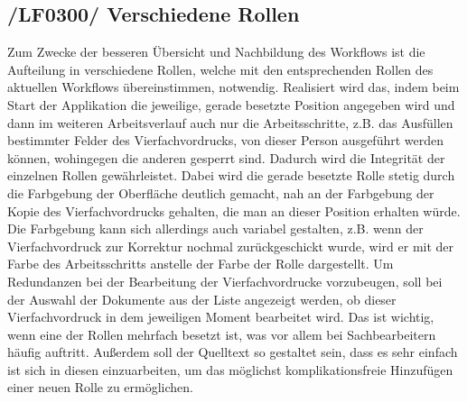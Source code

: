 \subsection{/LF0300/ Verschiedene Rollen}
Zum Zwecke der besseren Übersicht und Nachbildung des Workflows ist die Aufteilung in verschiedene Rollen, welche mit den entsprechenden Rollen des aktuellen Workflows übereinstimmen, notwendig. Realisiert wird das, indem beim Start der Applikation die jeweilige, gerade besetzte Position angegeben wird und dann im weiteren Arbeitsverlauf auch nur die Arbeitsschritte, z.B. das Ausfüllen bestimmter Felder des Vierfachvordrucks, von dieser Person ausgeführt werden können, wohingegen die anderen gesperrt sind. Dadurch wird die Integrität der einzelnen Rollen gewährleistet. Dabei wird die gerade besetzte Rolle stetig durch die Farbgebung der Oberfläche deutlich gemacht, nah an der Farbgebung der Kopie des Vierfachvordrucks gehalten, die man an dieser Position erhalten würde. Die Farbgebung kann sich allerdings auch variabel gestalten, z.B. wenn der Vierfachvordruck zur Korrektur nochmal zurückgeschickt wurde, wird er mit der Farbe des Arbeitsschritts anstelle der Farbe der Rolle dargestellt. Um Redundanzen bei der Bearbeitung der Vierfachvordrucke vorzubeugen, soll bei der Auswahl der Dokumente aus der Liste angezeigt werden, ob dieser Vierfachvordruck in dem jeweiligen Moment bearbeitet wird. Das ist wichtig, wenn eine der Rollen mehrfach besetzt ist, was vor allem bei  Sachbearbeitern häufig auftritt. Außerdem soll der Quelltext so gestaltet sein, dass es sehr einfach ist sich in diesen einzuarbeiten, um das möglichst komplikationsfreie Hinzufügen einer neuen Rolle zu ermöglichen.
